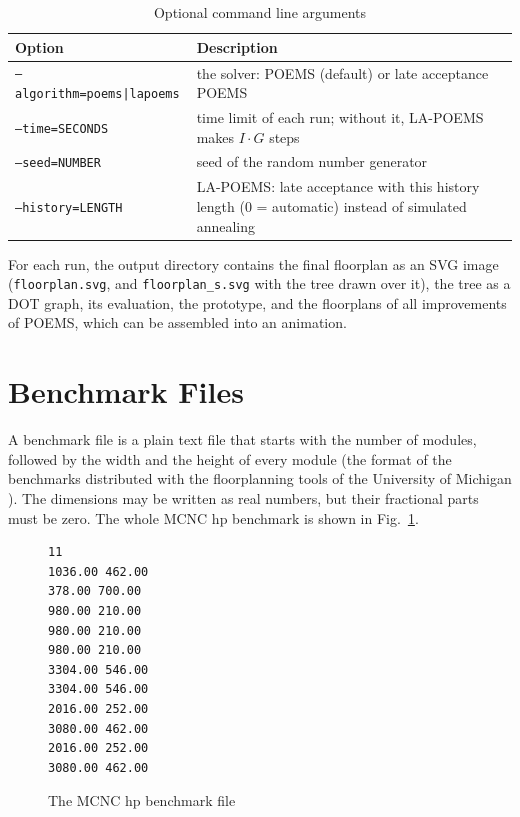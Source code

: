 \begin{table}
\begin{center}
\begin{tabularx}{\textwidth}{@{}lX@{}}
\toprule
Option & Description \\
\midrule
{\tt --algorithm=poems|lapoems} & the solver: POEMS (default) or late acceptance POEMS \\
{\tt --time=SECONDS} & time limit of each run; without it, LA-POEMS makes $I \cdot G$ steps \\
{\tt --seed=NUMBER} & seed of the random number generator \\
{\tt --history=LENGTH} & LA-POEMS: late acceptance with this history length (0 = automatic) instead of simulated annealing \\
\bottomrule
\end{tabularx}
\end{center}
\caption{Optional command line arguments}
\label{tab:options}
\end{table}

For each run, the output directory contains the final floorplan as an SVG image ({\tt floorplan.svg}, and {\tt floorplan\_s.svg} with the tree drawn over it), the tree as a DOT graph, its evaluation, the prototype, and the floorplans of all improvements of POEMS, which can be assembled into an animation.

\section{Benchmark Files}

A benchmark file is a plain text file that starts with the number of modules, followed by the width and the height of every module (the format of the benchmarks distributed with the floorplanning tools of the University of Michigan \cite{bench}). The dimensions may be written as real numbers, but their fractional parts must be zero. The whole MCNC hp benchmark is shown in Fig.~\ref{fig:hpcode}.

\begin{figure}
\begin{minipage}{\textwidth}
\begin{verbatim}
11
1036.00 462.00
378.00 700.00
980.00 210.00
980.00 210.00
980.00 210.00
3304.00 546.00
3304.00 546.00
2016.00 252.00
3080.00 462.00
2016.00 252.00
3080.00 462.00
\end{verbatim}
\end{minipage}
\caption{The MCNC hp benchmark file}
\label{fig:hpcode}
\end{figure}

